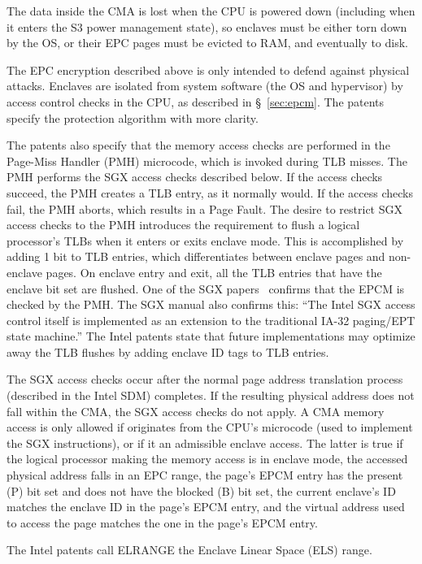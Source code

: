The data inside the CMA is lost when the CPU is powered down (including when it
enters the S3 power management state), so enclaves must be either torn down by
the OS, or their EPC pages must be evicted to RAM, and eventually to disk.

The EPC encryption described above is only intended to defend against physical
attacks. Enclaves are isolated from system software (the OS and hypervisor) by
access control checks in the CPU, as described in \S~\ref{sec:epcm}. The
patents specify the protection algorithm with more clarity.

The patents also specify that the memory access checks are performed in the
Page-Miss Handler (PMH) microcode, which is invoked during TLB misses. The PMH
performs the SGX access checks described below. If the access checks succeed,
the PMH creates a TLB entry, as it normally would. If the access checks fail,
the PMH aborts, which results in a Page Fault. The desire to restrict SGX
access checks to the PMH introduces the requirement to flush a logical
processor's TLBs when it enters or exits enclave mode. This is accomplished by
adding 1 bit to TLB entries, which differentiates between enclave pages and
non-enclave pages.
On enclave entry and exit, all the TLB entries that have the enclave bit set
are flushed. One of the SGX papers~\cite{mckeen2013sgx} confirms that the EPCM
is checked by the PMH.
The SGX manual also confirms this: ``The Intel SGX access control itself is
implemented as an extension to the traditional IA-32 paging/EPT state
machine.''
The Intel patents state that future implementations may optimize away the TLB
flushes by adding enclave ID tags to TLB entries.

The SGX access checks occur after the normal page address translation process
(described in the Intel SDM) completes.
If the resulting physical address does not fall within the CMA, the
SGX access checks do not apply.
A CMA memory access is only allowed if originates from the CPU's microcode
(used to implement the SGX instructions), or if it an admissible enclave
access.
The latter is true if the logical processor making the memory access is in
enclave mode, the accessed physical address falls in an EPC range, the page's
EPCM entry has the present (P) bit set and does not have the blocked (B) bit
set, the current enclave's ID matches the enclave ID in the page's EPCM entry,
and the virtual address used to access the page matches the one in the page's
EPCM entry.

The Intel patents call ELRANGE the Enclave Linear Space (ELS) range.



